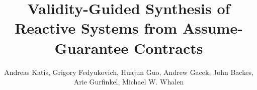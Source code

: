 \documentclass[10pt,conference]{llncs}
\begin{document}
\title{Validity-Guided Synthesis of Reactive Systems from Assume-Guarantee Contracts}

\iffalse
\author{\IEEEauthorblockN{Andreas Katis\IEEEauthorrefmark{1}, Grigory Fedyukovich\IEEEauthorrefmark{2},  Huajun
Guo\IEEEauthorrefmark{1}, Andrew Gacek\IEEEauthorrefmark{3}\\ John
Backes\IEEEauthorrefmark{3}, Arie Gurfinkel\IEEEauthorrefmark{4} and
Michael W. Whalen\IEEEauthorrefmark{1}}
\IEEEauthorblockA{\IEEEauthorrefmark{1}Department of Computer Science and
Engineering,
University of Minnesota\\
Email: \{katis001,guoxx663\}@umn.edu, whalen@cs.umn.edu}
\IEEEauthorblockA{\IEEEauthorrefmark{2}University of Washington Paul G. Allen School of Computer Science \& Engineering\\
Email: grigory@cs.washington.edu}
\IEEEauthorblockA{\IEEEauthorrefmark{3}Rockwell Collins Advanced Technology Center\\
Email: \{andrew.gacek,john.backes\}@rockwellcollins.com}
\IEEEauthorblockA{\IEEEauthorrefmark{4}Department of Electrical and Computer
Engineering, University of Waterloo\\
Email: agurfinkel@uwaterloo.ca}}
\fi 

\author{Andreas Katis, Grigory Fedyukovich, Huajun Guo, 
  Andrew Gacek, John Backes, Arie Gurfinkel, Michael
  W. Whalen}%




\maketitle
\end{document}
